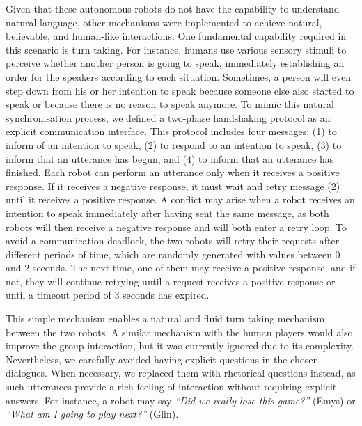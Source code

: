 Given that these autonomous robots do not have the capability to understand natural language, other mechanisms were implemented to achieve natural, believable, and human-like interactions. One fundamental capability required in this scenario is turn taking. For instance, humans use various sensory stimuli to perceive whether another person is going to speak, immediately establishing an order for the speakers according to each situation. Sometimes, a person will even step down from his or her intention to speak because someone else also started to speak or because there is no reason to speak anymore. To mimic this natural synchronisation process, we defined a two-phase handshaking protocol as an explicit communication interface.
This protocol includes four messages: (1) to inform of an intention to speak, (2) to respond to an intention to speak, (3) to inform that an utterance has begun, and (4) to inform that an utterance has finished. Each robot can perform an utterance only when it receives a positive response. If it receives a negative response, it must wait and retry message (2) until it receives a positive response. A conflict may arise when a robot receives an intention to speak immediately after having sent the same message, as both robots will then receive a negative response and will both enter a retry loop. To avoid a communication deadlock, the two robots will retry their requests after different periods of time, which are randomly generated with values between 0 and 2 seconds. The next time, one of them may receive a positive response, and if not, they will continue retrying until a request receives a positive response or until a timeout period of 3 seconds has expired.


This simple mechanism enables a natural and fluid turn taking mechanism between the two robots. A similar mechanism with the human players would also improve the group interaction, but it was currently ignored due to its complexity. Nevertheless, we carefully avoided having explicit questions in the chosen dialogues. When necessary, we replaced them with rhetorical questions instead, as such utterances provide a rich feeling of interaction without requiring explicit answers. For instance, a robot may say \emph{``Did we really lose this game?''} (Emys) or \emph{``What am I going to play next?''} (Glin). %



